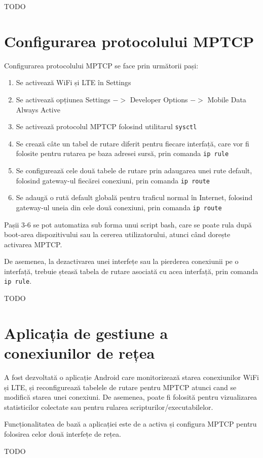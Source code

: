 TODO

\section{Configurarea protocolului MPTCP}

Configurarea protocolului MPTCP se face prin următorii pași:
\begin{enumerate}
	\item Se activează WiFi și LTE în Settings
	\item Se activează opțiunea Settings $->$ Developer Options $->$ Mobile Data Always Active
	\item Se activează protocolul MPTCP folosind utilitarul \texttt{sysctl}
	\item Se crează câte un tabel de rutare diferit pentru fiecare interfață, care vor fi folosite pentru rutarea pe baza adresei sursă, prin comanda \texttt{ip rule}
	\item Se configurează cele două tabele de rutare prin adaugarea unei rute default, folosind gateway-ul fiecărei conexiuni, prin comanda \texttt{ip route} 
	\item Se adaugă o rută default globală pentru traficul normal în Internet, folosind gateway-ul uneia din cele două conexiuni, prin comanda \texttt{ip route}
\end{enumerate}
Pașii 3-6 se pot automatiza sub forma unui script bash, care se poate rula după boot-area dispozitivului sau la cererea utilizatorului, atunci când dorește activarea MPTCP. 

De asemenea, la dezactivarea unei interfețe sau la pierderea conexiunii pe o interfață, trebuie șteasă tabela de rutare asociată cu acea interfață, prin comanda \texttt{ip rule}. 

TODO

\section{Aplicația de gestiune a conexiunilor de rețea}

A fost dezvoltată o aplicație Android care monitorizează starea conexiunilor WiFi și LTE, și reconfigurează tabelele de rutare pentru MPTCP atunci cand se modifică starea unei conexiuni. De asemenea, poate fi folosită pentru vizualizarea statisticilor colectate sau pentru rularea scripturilor/executabilelor. 

Funcționalitatea de bază a aplicației este de a activa și configura MPTCP pentru folosirea celor două interfețe de rețea. 

TODO


